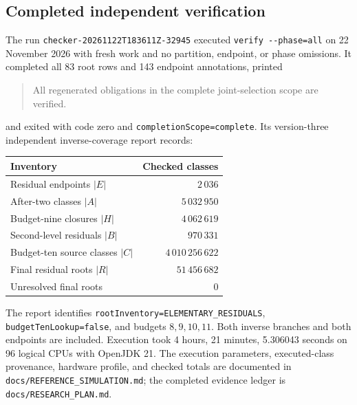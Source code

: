\documentclass[11pt,a4paper]{article}
\begin{document}
\subsection{Completed independent verification}
The run \nolinkurl{checker-20261122T183611Z-32945} executed
\nolinkurl{verify --phase=all} on 22 November 2026 with fresh work and no
partition, endpoint, or phase omissions. It completed all 83 root rows and
143 endpoint annotations, printed
\begin{quote}\small
All regenerated obligations in the complete joint-selection scope are verified.
\end{quote}
and exited with code zero and \nolinkurl{completionScope=complete}.
Its version-three independent inverse-coverage report records:
\begin{center}
\begin{tabular}{@{}lr@{}}
\toprule Inventory & Checked classes\\\midrule
Residual endpoints $|E|$ & $2\,036$\\
After-two classes $|A|$ & $5\,032\,950$\\
Budget-nine closures $|H|$ & $4\,062\,619$\\
Second-level residuals $|B|$ & $970\,331$\\
Budget-ten source classes $|C|$ & $4\,010\,256\,622$\\
Final residual roots $|R|$ & $51\,456\,682$\\
Unresolved final roots & $0$\\\bottomrule
\end{tabular}
\end{center}
The report identifies \nolinkurl{rootInventory=ELEMENTARY_RESIDUALS},
\nolinkurl{budgetTenLookup=false}, and budgets $8,9,10,11$. Both inverse
branches and both endpoints are included. Execution took 4 hours, 21 minutes,
5.306043 seconds on 96 logical CPUs with OpenJDK 21. The execution parameters,
executed-class provenance, hardware profile, and checked totals are documented
in \nolinkurl{docs/REFERENCE_SIMULATION.md}; the completed evidence ledger is
\nolinkurl{docs/RESEARCH_PLAN.md}.
\end{document}
